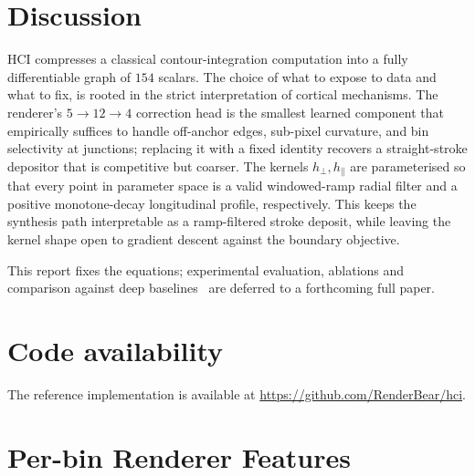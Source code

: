 \documentclass[11pt,a4paper]{article}
\begin{document}
\section{Discussion}\label{sec:discussion}

HCI compresses a classical contour-integration computation into a fully differentiable graph of $154$ scalars. The choice of what to expose to data and what to fix, is rooted in the strict interpretation of cortical mechanisms. The renderer's $5 \to 12 \to 4$ correction head is the smallest learned component that empirically suffices to handle off-anchor edges, sub-pixel curvature, and bin selectivity at junctions; replacing it with a fixed identity recovers a straight-stroke depositor that is competitive but coarser. The kernels $h_{\perp}, h_{\parallel}$ are parameterised so that every point in parameter space is a valid windowed-ramp radial filter and a positive monotone-decay longitudinal profile, respectively. This keeps the synthesis path interpretable as a ramp-filtered stroke deposit, while leaving the kernel shape open to gradient descent against the boundary objective.

This report fixes the equations; experimental evaluation, ablations and comparison against deep baselines~\cite{xie2015hed,liu2017rcf,he2019bdcn,pu2022edter,soria2023dexined,ye2024diffusionedge} are deferred to a forthcoming full paper.

\section*{Code availability}
The reference implementation is available at \url{https://github.com/RenderBear/hci}.

\appendix

\section{Per-bin Renderer Features}\label{app:feats}
\end{document}

